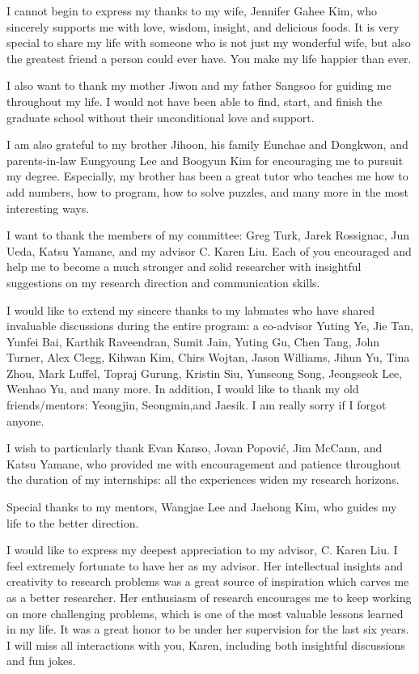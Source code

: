 I cannot begin to express my thanks to my wife, Jennifer Gahee Kim,
who sincerely supports me with love, wisdom, insight, and delicious foods.
It is very special to share my life with someone who is not just my wonderful
wife, but also the greatest friend a person could ever have.
You make my life happier than ever.

I also want to thank my mother Jiwon and my father Sangsoo for guiding me
throughout my life.
I would not have been able to find, start, and finish the graduate school without
their unconditional love and support.

I am also grateful to my brother Jihoon, his family Eunchae and Dongkwon,
and parents-in-law Eungyoung Lee and Boogyun Kim for encouraging me to pursuit
my degree.
Especially, my brother has been a great tutor who teaches me
how to add numbers, how to program, how to solve puzzles, and many more
in the most interesting ways.

I want to thank the members of my committee: Greg Turk, Jarek Rossignac,
Jun Ueda, Katsu Yamane, and my advisor C. Karen Liu.
Each of you encouraged and help me to become a much stronger and solid
researcher with insightful suggestions on my research direction and
communication skills.

I would like to extend my sincere thanks to my labmates
who have shared invaluable discussions during the entire program:
a co-advisor Yuting Ye, Jie Tan, Yunfei Bai, Karthik Raveendran, 
Sumit Jain, Yuting Gu, Chen Tang, John Turner, Alex Clegg, Kihwan Kim, 
Chirs Wojtan, Jason Williams, Jihun Yu, Tina Zhou, Mark Luffel, 
Topraj Gurung, Kristin Siu, Yunseong Song,
Jeongseok Lee, Wenhao Yu, and many more.
In addition, I would like to thank my old friends/mentors: Yeongjin, Seongmin,and Jaesik.
I am really sorry if I forgot anyone.

I wish to particularly thank Evan Kanso, Jovan Popovi\'{c}, Jim McCann, and
Katsu Yamane, who provided me with encouragement and patience throughout the
duration of my internships: all the experiences widen my research horizons.

Special thanks to my mentors, Wangjae Lee and Jaehong Kim, who
guides my life to the better direction.

I would like to express my deepest appreciation to my advisor, C. Karen Liu.
I feel extremely fortunate to have her as my advisor.
Her intellectual insights and creativity to research problems was a great
source of inspiration which carves me as a better researcher.
Her enthusiasm of research encourages me to keep working on more challenging
problems, which is one of the most valuable lessons learned in my life.
It was a great honor to be under her supervision for the last six years.
I will miss all interactions with you, Karen, 
including both insightful discussions and fun jokes. 












